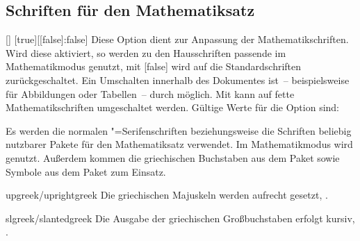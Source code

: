 \subsection{Schriften für den Mathematiksatz}
\begin{Declaration}[v2.03]{[\PBoolean]}%
  [true][[false]:false]
\printdeclarationlist%
\label{sec:math}
%
Diese Option dient zur Anpassung der Mathematikschriften. Wird diese aktiviert, 
so werden zu den Hausschriften passende im Mathematikmodus genutzt, mit 
[false] wird auf die Standardschriften zurückgeschaltet. Ein 
Umschalten innerhalb des Dokumentes ist~-- beispielsweise für Abbildungen oder 
Tabellen~-- durch  
möglich. Mit  kann auf fette Mathematikschriften umgeschaltet 
werden. Gültige Werte für die Option  sind:
%
\begin{values}
\itemfalse
  Es werden die normalen "=Serifenschriften beziehungsweise die 
  Schriften beliebig nutzbarer Pakete für den Mathematiksatz verwendet.
\itemtrue*
  Im Mathematikmodus wird \Univers genutzt. Außerdem kommen die griechischen 
  Buchstaben aus dem Paket  sowie Symbole aus dem Paket 
   zum Einsatz.
\item[upgreek/uprightgreek]
  Die griechischen Majuskeln werden aufrecht gesetzt, 
  .
\item[slgreek/slantedgreek]
  Die Ausgabe der griechischen Großbuchstaben erfolgt kursiv, 
  .
\end{values}
\end{Declaration}

